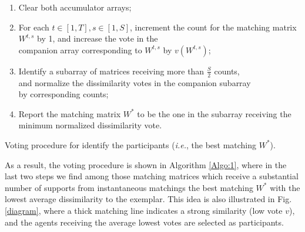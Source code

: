 \begin{algorithm}
\footnotesize{
\begin{enumerate}
\item Clear both accumulator arrays;
\item For each $t\in[1,T], s\in[1,S]$, increment the count for the matching matrix $W^{t,s}$ by 1, and increase the vote in the\\ 
companion array corresponding to $W^{t,s}$ by $v(W^{t,s})$;
\item Identify a subarray of matrices receiving more than $\frac{S}{2}$ counts, \\
and normalize the dissimilarity votes in the companion subarray 
\\by corresponding counts;
\item Report the matching matrix $W^{*}$ to be the one in the subarray receiving the minimum normalized dissimilarity vote.
\end{enumerate}
}
\caption{\small Voting procedure for identify the participants (\textit{i.e.}, the best matching $W^{*}$).}
\label{Algo:1}
\end{algorithm}
\vspace{-10pt}

 As a result, the voting procedure is shown in Algorithm \ref{Algo:1}, where in the last two steps we find among those matching matrices which receive a substantial number of supports from instantaneous matchings the best matching $W^{*}$ with the lowest average dissimilarity to the exemplar. This idea is also illustrated in Fig. \ref{diagram}, where a thick matching line indicates a strong similarity (low vote $v$), and the agents receiving the average lowest votes are selected as participants.


